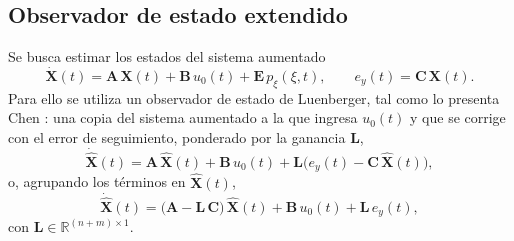 \subsection{Observador de estado extendido}
\label{subsec:observador}
Se busca estimar los estados del sistema aumentado
\begin{equation}
  \dot{\mathbf{X}}(t) = \mathbf{A}\,\mathbf{X}(t) + \mathbf{B}\,u_0(t)
+ \mathbf{E}\,p_{\xi}(\xi,t),
\qquad
e_y(t) = \mathbf{C}\,\mathbf{X}(t).
\end{equation}
Para ello se utiliza un observador de estado de Luenberger, tal como lo presenta
Chen \cite[sec.~8.4]{chen1999linear}: una copia del sistema aumentado a la que
ingresa $u_0(t)$ y que se corrige con el error de seguimiento, ponderado por la
ganancia $\mathbf{L}$,
\begin{equation}
\dot{\widehat{\mathbf{X}}}(t) = \mathbf{A}\,\widehat{\mathbf{X}}(t)
+ \mathbf{B}\,u_0(t)
+ \mathbf{L}\bigl(e_y(t) - \mathbf{C}\,\widehat{\mathbf{X}}(t)\bigr),
\end{equation}
o, agrupando los términos en $\widehat{\mathbf{X}}(t)$,
\begin{equation}
\dot{\widehat{\mathbf{X}}}(t) =
\bigl(\mathbf{A} - \mathbf{L}\,\mathbf{C}\bigr)\,\widehat{\mathbf{X}}(t)
+ \mathbf{B}\,u_0(t) + \mathbf{L}\,e_y(t) ,
\label{eq:observador}
\end{equation}
con $\mathbf{L} \in \mathbb{R}^{(n+m)\times 1}$.

